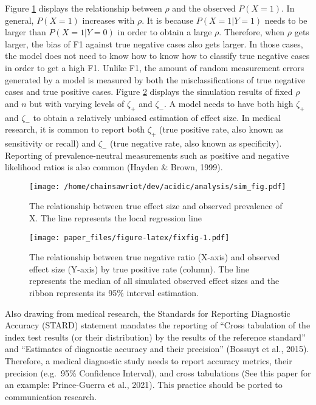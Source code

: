 \documentclass[english,man,floatsintext]{apa6}
\begin{document}
Figure \ref{fig:simfig} displays the relationship between \(\rho\) and the observed \(P(X=1)\). In general, \(P(X=1)\) increases with \(\rho\). It is because \(P(X=1|Y=1)\) needs to be larger than \(P(X=1|Y=0)\) in order to obtain a large \(\rho\). Therefore, when \(\rho\) gets larger, the bias of F1 against true negative cases also gets larger. In those cases, the model does not need to know how to know how to classify true negative cases in order to get a high F1. Unlike F1, the amount of random measurement errors generated by a model is measured by both the misclassifications of true negative cases and true positive cases. Figure \ref{fig:fixfig} displays the simulation results of fixed \(\rho\) and \(n\) but with varying levels of \(\zeta_{+}\) and \(\zeta_{-}\). A model needs to have both high \(\zeta_{+}\) and \(\zeta_{-}\) to obtain a relatively unbiased estimation of effect size. In medical research, it is common to report both \(\zeta_{+}\) (true positive rate, also known as sensitivity or recall) and \(\zeta_{-}\) (true negative rate, also known as specificity). Reporting of prevalence-neutral measurements such as positive and negative likelihood ratios is also common (Hayden \& Brown, 1999).

\begin{figure}
\centering
\texttt{[image: /home/chainsawriot/dev/acidic/analysis/sim\_fig.pdf]}
\caption{\label{fig:simfig}The relationship between true effect size and observed prevalence of X. The line represents the local regression line}
\end{figure}

\begin{figure}
\centering
\texttt{[image: paper\_files/figure-latex/fixfig-1.pdf]}
\caption{\label{fig:fixfig}The relationship between true negative ratio (X-axis) and observed effect size (Y-axis) by true positive rate (column). The line represents the median of all simulated observed effect sizes and the ribbon represents its 95\% interval estimation.}
\end{figure}

Also drawing from medical research, the Standards for Reporting Diagnostic Accuracy (STARD) statement mandates the reporting of \enquote{Cross tabulation of the index test results (or their distribution) by the results of the reference standard} and \enquote{Estimates of diagnostic accuracy and their precision} (Bossuyt et al., 2015). Therefore, a medical diagnostic study needs to report accuracy metrics, their precision (e.g.~95\% Confidence Interval), and cross tabulations (See this paper for an example: Prince-Guerra et al., 2021). This practice should be ported to communication research.
\end{document}
